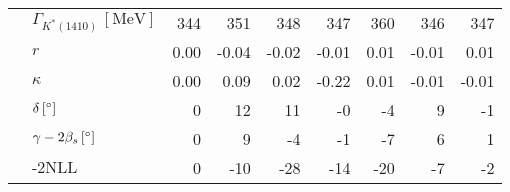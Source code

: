 \begin{tabular}{l l  r  r  r  r  r  r  r  }
 & $\Gamma_{K^{*}(1410)} \, [\text{MeV}]$ & 344 & 351 & 348 & 347 & 360 & 346 & 347 \\ 
 & $r$ & 0.00 & -0.04 & -0.02 & -0.01 & 0.01 & -0.01 & 0.01 \\ 
 & $\kappa$ & 0.00 & 0.09 & 0.02 & -0.22 & 0.01 & -0.01 & -0.01 \\ 
 & $\delta \, [^{\circ}]$ & 0 & 12 & 11 & -0 & -4 & 9 & -1 \\ 
 & $\gamma - 2 \beta_{s} \, [^{\circ}]$ & 0 & 9 & -4 & -1 & -7 & 6 & 1 \\ 
 & $\text{-2NLL}$ & 0 & -10 & -28 & -14 & -20 & -7 & -2 \\ 
\hline
\hline
\end{tabular}
